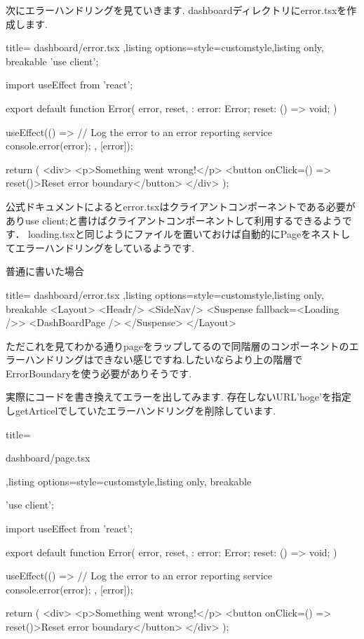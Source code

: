 次にエラーハンドリングを見ていきます.
dashboardディレクトリにerror.tsxを作成します.


\begin{tcblisting}{title={
        dashboard/error.tsx
      },listing options={style=customstyle},listing only, breakable}
  'use client';

  import { useEffect } from 'react';

  export default function Error({
      error,
      reset,
    }: {
  error: Error;
  reset: () => void;
  }) {
  useEffect(() => {
  // Log the error to an error reporting service
  console.error(error);
  }, [error]);

  return (
  <div>
  <p>Something went wrong!</p>
  <button onClick={() => reset()}>Reset error boundary</button>
  </div>
  );
  }
\end{tcblisting}



公式ドキュメントによるとerror.tsxはクライアントコンポーネントである必要がありuse client;と書けばクライアントコンポーネントして利用するできるようです．
loading.tsxと同じようにファイルを置いておけば自動的にPageをネストしてエラーハンドリングをしているようです.

普通に書いた場合


\begin{tcblisting}{title={
  dashboard/error.tsx
},listing options={style=customstyle},listing only, breakable}
<Layout>
    <Headr/>
    <SideNav/>
    <Suspense fallback={<Loading />}>
      <DashBoardPage />
    </Suspense>
</Layout>
\end{tcblisting}



ただこれを見てわかる通りpageをラップしてるので同階層のコンポーネントのエラーハンドリングはできない感じですね.したいならより上の階層でErrorBoundaryを使う必要がありそうです.

実際にコードを書き換えてエラーを出してみます.
存在しないURL'hoge'を指定しgetArticelでしていたエラーハンドリングを削除しています.


\begin{tcblisting}{title={

        dashboard/page.tsx
      },listing options={style=customstyle},listing only, breakable}

      'use client';

      import { useEffect } from 'react';
      
      export default function Error({
        error,
        reset,
      }: {
        error: Error;
        reset: () => void;
      }) {
        useEffect(() => {
          // Log the error to an error reporting service
          console.error(error);
        }, [error]);
      
        return (
          <div>
            <p>Something went wrong!</p>
            <button onClick={() => reset()}>Reset error boundary</button>
          </div>
        );
      }

\end{tcblisting}


